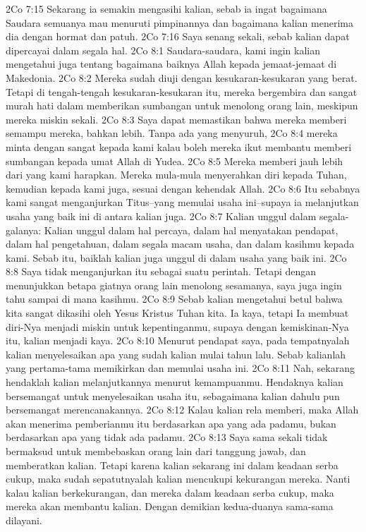 2Co 7:15  Sekarang ia semakin mengasihi kalian, sebab ia ingat bagaimana Saudara semuanya mau menuruti pimpinannya dan bagaimana kalian menerima dia dengan hormat dan patuh.
2Co 7:16  Saya senang sekali, sebab kalian dapat dipercayai dalam segala hal.
2Co 8:1  Saudara-saudara, kami ingin kalian mengetahui juga tentang bagaimana baiknya Allah kepada jemaat-jemaat di Makedonia.
2Co 8:2  Mereka sudah diuji dengan kesukaran-kesukaran yang berat. Tetapi di tengah-tengah kesukaran-kesukaran itu, mereka bergembira dan sangat murah hati dalam memberikan sumbangan untuk menolong orang lain, meskipun mereka miskin sekali.
2Co 8:3  Saya dapat memastikan bahwa mereka memberi semampu mereka, bahkan lebih. Tanpa ada yang menyuruh,
2Co 8:4  mereka minta dengan sangat kepada kami kalau boleh mereka ikut membantu memberi sumbangan kepada umat Allah di Yudea.
2Co 8:5  Mereka memberi jauh lebih dari yang kami harapkan. Mereka mula-mula menyerahkan diri kepada Tuhan, kemudian kepada kami juga, sesuai dengan kehendak Allah.
2Co 8:6  Itu sebabnya kami sangat menganjurkan Titus--yang memulai usaha ini--supaya ia melanjutkan usaha yang baik ini di antara kalian juga.
2Co 8:7  Kalian unggul dalam segala-galanya: Kalian unggul dalam hal percaya, dalam hal menyatakan pendapat, dalam hal pengetahuan, dalam segala macam usaha, dan dalam kasihmu kepada kami. Sebab itu, baiklah kalian juga unggul di dalam usaha yang baik ini.
2Co 8:8  Saya tidak menganjurkan itu sebagai suatu perintah. Tetapi dengan menunjukkan betapa giatnya orang lain menolong sesamanya, saya juga ingin tahu sampai di mana kasihmu.
2Co 8:9  Sebab kalian mengetahui betul bahwa kita sangat dikasihi oleh Yesus Kristus Tuhan kita. Ia kaya, tetapi Ia membuat diri-Nya menjadi miskin untuk kepentinganmu, supaya dengan kemiskinan-Nya itu, kalian menjadi kaya.
2Co 8:10  Menurut pendapat saya, pada tempatnyalah kalian menyelesaikan apa yang sudah kalian mulai tahun lalu. Sebab kalianlah yang pertama-tama memikirkan dan memulai usaha ini.
2Co 8:11  Nah, sekarang hendaklah kalian melanjutkannya menurut kemampuanmu. Hendaknya kalian bersemangat untuk menyelesaikan usaha itu, sebagaimana kalian dahulu pun bersemangat merencanakannya.
2Co 8:12  Kalau kalian rela memberi, maka Allah akan menerima pemberianmu itu berdasarkan apa yang ada padamu, bukan berdasarkan apa yang tidak ada padamu.
2Co 8:13  Saya sama sekali tidak bermaksud untuk membebaskan orang lain dari tanggung jawab, dan memberatkan kalian. Tetapi karena kalian sekarang ini dalam keadaan serba cukup, maka sudah sepatutnyalah kalian mencukupi kekurangan mereka. Nanti kalau kalian berkekurangan, dan mereka dalam keadaan serba cukup, maka mereka akan membantu kalian. Dengan demikian kedua-duanya sama-sama dilayani.
